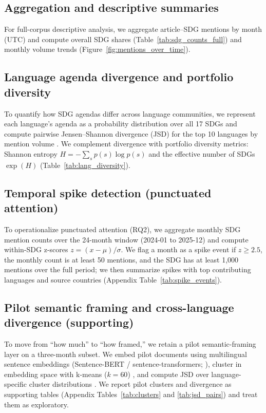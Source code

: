 \documentclass[11pt]{article}
\begin{document}
\subsection{Aggregation and descriptive summaries}
For full-corpus descriptive analysis, we aggregate article--SDG mentions by month (UTC) and compute overall SDG shares (Table~\ref{tab:sdg_counts_full}) and monthly volume trends (Figure~\ref{fig:mentions_over_time}).

\subsection{Language agenda divergence and portfolio diversity}
To quantify how SDG agendas differ across language communities, we represent each language's agenda as a probability distribution over all 17 SDGs and compute pairwise Jensen--Shannon divergence (JSD) for the top 10 languages by mention volume \parencite{lin1991jsd}. We complement divergence with portfolio diversity metrics: Shannon entropy $H=-\sum_s p(s)\log p(s)$ and the effective number of SDGs $\exp(H)$ (Table~\ref{tab:lang_diversity}).

\subsection{Temporal spike detection (punctuated attention)}
To operationalize punctuated attention (RQ2), we aggregate monthly SDG mention counts over the 24-month window (2024-01 to 2025-12) and compute within-SDG z-scores $z=(x-\mu)/\sigma$. We flag a month as a spike event if $z\ge 2.5$, the monthly count is at least 50 mentions, and the SDG has at least 1{,}000 mentions over the full period; we then summarize spikes with top contributing languages and source countries (Appendix Table~\ref{tab:spike_events}).

\subsection{Pilot semantic framing and cross-language divergence (supporting)}
To move from ``how much'' to ``how framed,'' we retain a pilot semantic-framing layer on a three-month subset. We embed pilot documents using multilingual sentence embeddings (Sentence-BERT / sentence-transformers; \cite{reimers2019sbert}), cluster in embedding space with k-means ($k=60$) \parencite{macqueen1967kmeans}, and compute JSD over language-specific cluster distributions \parencite{lin1991jsd}. We report pilot clusters and divergence as supporting tables (Appendix Tables~\ref{tab:clusters} and \ref{tab:jsd_pairs}) and treat them as exploratory.
\end{document}
